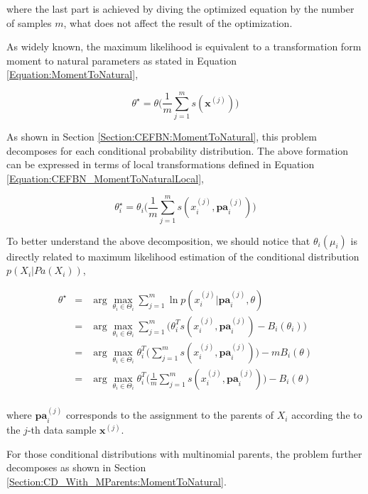 \documentclass[11pt, oneside]{article}   	%
\newcommand{\bm}{\mathbf}
\numberwithin{figure}{section}
\numberwithin{equation}{section}
\numberwithin{table}{section}
\theoremstyle{definition}
\begin{document}
\noindent where the last part is achieved by diving the optimized equation by the number of samples $m$, what does not affect the result of the optimization. 

As widely known, the maximum likelihood is equivalent to a transformation form moment to natural parameters as stated in Equation \ref{Equation:MomentToNatural}, 

$$\theta^\star = \theta\Big(\frac{1}{m}\sum_{j=1}^m s(\bm x^{(j)})\Big)$$

As shown in Section \ref{Section:CEFBN:MomentToNatural}, this problem decomposes for each conditional probability distribution.  The above formation can be expressed in terms of local transformations defined in Equation \ref{Equation:CEFBN_MomentToNaturalLocal}, 

$$\theta_i^\star = \theta_i\Big(\frac{1}{m}\sum_{j=1}^m s(x_i^{(j)},\bm{pa}^{(j)}_i)\Big)$$


To better understand the above decomposition, we should notice that $\theta_i(\mu_i)$ is directly related to maximum likelihood estimation of the conditional distribution $p(X_i|Pa(X_i))$, 

\begin{eqnarray*}
\theta^\star  &=& \arg\max_{\theta_i \in \Theta_i} \sum_{j=1}^m \ln p(x_i^{(j)}|\bm{pa}^{(j)}_i,\theta) \\
&=& \arg\max_{\theta_i \in \Theta_i} \sum_{j=1}^m \Big(\theta_i^Ts(x_i^{(j)},\bm{pa}^{(j)}_i)  - B_i(\theta_i) \Big)\\
&=& \arg\max_{\theta_i \in \Theta_i} \theta_i^T\Big(\sum_{j=1}^m s(x_i^{(j)},\bm{pa}^{(j)}_i) \Big)  - m B_i(\theta) \\
&=& \arg\max_{\theta_i \in \Theta_i} \theta_i^T\Big(\frac{1}{m}\sum_{j=1}^m s(x_i^{(j)},\bm{pa}^{(j)}_i) \Big)  - B_i(\theta) \\
\end{eqnarray*}

\noindent where $\bm{pa}^{(j)}_i$ corresponds to the assignment to the parents of $X_i$ according the to the $j$-th data sample $\bm x^{(j)}$.

For those conditional distributions with multinomial parents, the problem further decomposes as shown in Section \ref{Section:CD_With_MParents:MomentToNatural}. 
\end{document}

